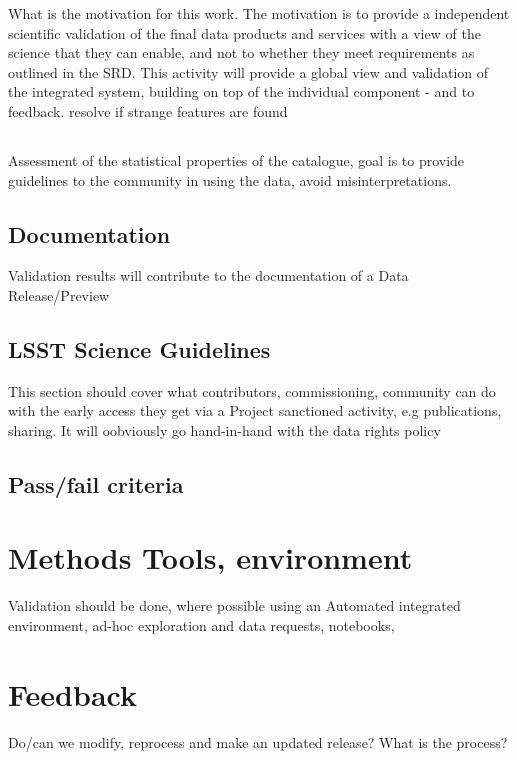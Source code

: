 What is the motivation for this work. The motivation is to provide a independent scientific validation of the final data products and services with a view of  the science that they can enable, and not to whether they meet requirements as outlined in the SRD. This activity will provide a global view and validation of the integrated system, building on top of the individual  component  - and to feedback. resolve if strange features are found

\subsection{}
Assessment of the statistical properties of the catalogue, goal is to provide guidelines to the community in using the data, avoid misinterpretations. 

\subsection{Documentation}
Validation results will contribute to the documentation of a Data Release/Preview


\subsection{LSST Science Guidelines}
This section should cover what contributors, commissioning, community can do with the early access they get via a Project sanctioned activity, e.g publications, sharing. It will oobviously go hand-in-hand with the data rights policy

\subsection{Pass/fail criteria}
\label{sec:passfail}


\section{Methods Tools, environment}

Validation should be done, where possible using an Automated integrated environment, ad-hoc exploration and data requests, notebooks, 

\section{Feedback}

Do/can we modify, reprocess and make an updated release? What is the process? 

